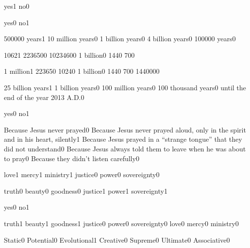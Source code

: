 {yes}{1}
{no}{0}
\qstop

{yes}{0}
{no}{1}
\qstop

{500000 years}{1}
{10 million years}{0}
{1 billion years}{0}
{4 billion years}{0}
{100000 years}{0}
\qstop

{1062}{1}
{223650}{0}
{1023460}{0}
{1 billion}{0}
{144}{0}
{70}{0}
\qstop

{1 million}{1}
{22365}{0}
{1024}{0}
{1 billion}{0}
{144}{0}
{70}{0}
{144000}{0}
\qstop

{25 billion years}{1}
{1 billion years}{0}
{100 million years}{0}
{100 thousand years}{0}
{until the end of the year 2013 A.D.}{0}
\qstop

{yes}{0}
{no}{1}
\qstop

{Because Jesus never prayed}{0}
{Because Jesus never prayed aloud, only in the spirit and in his heart, silently}{1}
{Because Jesus prayed in a ``strange tongue'' that they did not understand}{0}
{Because Jesus always told them to leave when he was about to pray}{0}
{Because they didn't listen carefully}{0}
\qstop

{love}{1}
{mercy}{1}
{ministry}{1}
{justice}{0}
{power}{0}
{sovereignty}{0}
\qstop

{truth}{0}
{beauty}{0}
{goodness}{0}
{justice}{1}
{power}{1}
{sovereignty}{1}
\qstop

{yes}{0}
{no}{1}
\qstop

{truth}{1}
{beauty}{1}
{goodness}{1}
{justice}{0}
{power}{0}
{sovereignty}{0}
{love}{0}
{mercy}{0}
{ministry}{0}
\qstop

{Static}{0}
{Potential}{0}
{Evolutional}{1}
{Creative}{0}
{Supreme}{0}
{Ultimate}{0}
{Associative}{0}
\qstop

